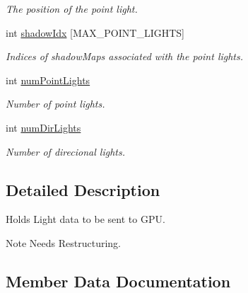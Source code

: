\begin{DoxyCompactItemize}
\begin{DoxyCompactList}\small\item\em The position of the point light. \end{DoxyCompactList}\item 
int \hyperlink{structblaze_1_1LightsUBlock_a2678f626f12d1fc23e8ec2aaa23cbbdc}{shadow\+Idx} \mbox{[}M\+A\+X\+\_\+\+P\+O\+I\+N\+T\+\_\+\+L\+I\+G\+H\+TS\mbox{]}
\begin{DoxyCompactList}\small\item\em Indices of shadow\+Maps associated with the point lights. \end{DoxyCompactList}\item 
\mbox{\label{structblaze_1_1LightsUBlock_a0f6aff7864b13668a095734fd1041534}} 
int \hyperlink{structblaze_1_1LightsUBlock_a0f6aff7864b13668a095734fd1041534}{num\+Point\+Lights}
\begin{DoxyCompactList}\small\item\em Number of point lights. \end{DoxyCompactList}\item 
\mbox{\label{structblaze_1_1LightsUBlock_a51ea7670e9599fa81a04ae1284af8d01}} 
int \hyperlink{structblaze_1_1LightsUBlock_a51ea7670e9599fa81a04ae1284af8d01}{num\+Dir\+Lights}
\begin{DoxyCompactList}\small\item\em Number of direcional lights. \end{DoxyCompactList}\end{DoxyCompactItemize}


\subsection{Detailed Description}
Holds Light data to be sent to G\+PU. 

\begin{DoxyNote}{Note}
Needs Restructuring. 
\end{DoxyNote}


\subsection{Member Data Documentation}
\mbox{\label{structblaze_1_1LightsUBlock_a5cf761c28dd781d9b239af72acdb5589}} 
